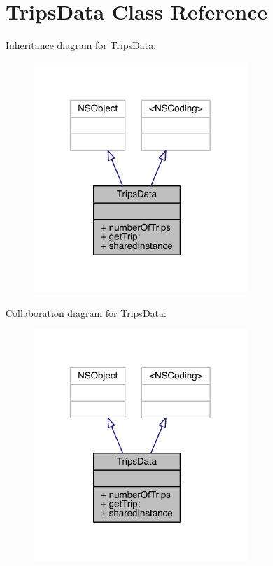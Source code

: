 \hypertarget{interface_trips_data}{\section{Trips\-Data Class Reference}
\label{interface_trips_data}
}


Inheritance diagram for Trips\-Data\-:\nopagebreak
\begin{figure}[H]
\begin{center}
\leavevmode
\includegraphics[width=229pt]{interface_trips_data__inherit__graph}
\end{center}
\end{figure}


Collaboration diagram for Trips\-Data\-:\nopagebreak
\begin{figure}[H]
\begin{center}
\leavevmode
\includegraphics[width=229pt]{interface_trips_data__coll__graph}
\end{center}
\end{figure}
